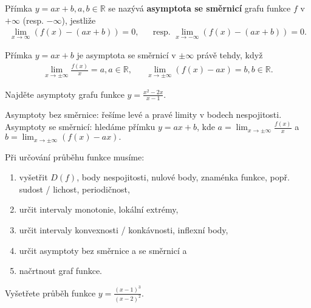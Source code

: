 \begin{definition}
Přímka $y=ax+b, a,b\in \mathbb R$ se nazývá \textbf{asymptota se směrnicí} grafu
funkce $f$ v $+\infty$ (resp. $-\infty$), jestliže
\begin{align*}
    \lim_{x\to\infty}(f(x)-(ax+b))=0, & & \textrm{resp. }\lim_{x\to-\infty}(f(x)-(ax+b))=0.
\end{align*}
\end{definition}

\begin{veta}
    Přímka $y=ax+b$ je asymptota se směrnicí v $\pm\infty$ právě tehdy, když
    \begin{align*}
        \lim_{x\to\pm\infty}\frac{f(x)}{x}=a, a\in \mathbb R, & & \lim_{x\to\pm\infty}(f(x)-ax)=b,b \in \mathbb R.
    \end{align*}
\end{veta}

\begin{priklad}
Najděte asymptoty grafu funkce $y=\frac{x^2-2x}{x-1}.$
\end{priklad}

\begin{reseni}
Asymptoty bez směrnice: řešíme levé a pravé limity v bodech nespojitosti.
Asymptoty se směrnicí: hledáme přímku $y=ax+b$, kde $a=\lim_{x\to \pm \infty}\frac{f(x)}{x}$ a
$b=\lim_{x\to \pm \infty}(f(x)-ax).$
\end{reseni}

\begin{pozn}
    Při určování průběhu funkce musíme:
    \begin{enumerate}[$i.$]
    \item vyšetřit $D(f)$, body nespojitosti, nulové body, znaménka funkce, popř.
    sudost / lichost, periodičnost,
   	\item určit intervaly monotonie, lokální extrémy,
   	\item určit intervaly konvexnosti / konkávnosti, inflexní body,
   	\item určit asymptoty bez směrnice a se směrnicí a
   	\item načrtnout graf funkce.
    \end{enumerate}
\end{pozn}

\begin{priklad}
Vyšetřete průběh funkce $y=\frac{(x-1)^3}{(x-2)^2}$.
\end{priklad}
